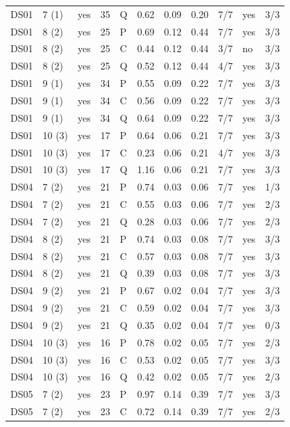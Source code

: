 \documentclass[10pt]{article}
\begin{document}
{\begin{longtable}{lllrlrrrrlr}
DS01 & 7 (1) & yes & 35 & Q & 0.62 & 0.09 & 0.20 & 7/7 & yes & 3/3 \\
DS01 & 8 (2) & yes & 25 & P & 0.69 & 0.12 & 0.44 & 7/7 & yes & 3/3 \\
DS01 & 8 (2) & yes & 25 & C & 0.44 & 0.12 & 0.44 & 3/7 & no & 3/3 \\
DS01 & 8 (2) & yes & 25 & Q & 0.52 & 0.12 & 0.44 & 4/7 & yes & 3/3 \\
DS01 & 9 (1) & yes & 34 & P & 0.55 & 0.09 & 0.22 & 7/7 & yes & 3/3 \\
DS01 & 9 (1) & yes & 34 & C & 0.56 & 0.09 & 0.22 & 7/7 & yes & 3/3 \\
DS01 & 9 (1) & yes & 34 & Q & 0.64 & 0.09 & 0.22 & 7/7 & yes & 3/3 \\
DS01 & 10 (3) & yes & 17 & P & 0.64 & 0.06 & 0.21 & 7/7 & yes & 3/3 \\
DS01 & 10 (3) & yes & 17 & C & 0.23 & 0.06 & 0.21 & 4/7 & yes & 3/3 \\
DS01 & 10 (3) & yes & 17 & Q & 1.16 & 0.06 & 0.21 & 7/7 & yes & 3/3 \\
\midrule
DS04 & 7 (2) & yes & 21 & P & 0.74 & 0.03 & 0.06 & 7/7 & yes & 1/3 \\
DS04 & 7 (2) & yes & 21 & C & 0.55 & 0.03 & 0.06 & 7/7 & yes & 2/3 \\
DS04 & 7 (2) & yes & 21 & Q & 0.28 & 0.03 & 0.06 & 7/7 & yes & 2/3 \\
DS04 & 8 (2) & yes & 21 & P & 0.74 & 0.03 & 0.08 & 7/7 & yes & 3/3 \\
DS04 & 8 (2) & yes & 21 & C & 0.57 & 0.03 & 0.08 & 7/7 & yes & 3/3 \\
DS04 & 8 (2) & yes & 21 & Q & 0.39 & 0.03 & 0.08 & 7/7 & yes & 3/3 \\
DS04 & 9 (2) & yes & 21 & P & 0.67 & 0.02 & 0.04 & 7/7 & yes & 3/3 \\
DS04 & 9 (2) & yes & 21 & C & 0.59 & 0.02 & 0.04 & 7/7 & yes & 3/3 \\
DS04 & 9 (2) & yes & 21 & Q & 0.35 & 0.02 & 0.04 & 7/7 & yes & 0/3 \\
DS04 & 10 (3) & yes & 16 & P & 0.78 & 0.02 & 0.05 & 7/7 & yes & 2/3 \\
DS04 & 10 (3) & yes & 16 & C & 0.53 & 0.02 & 0.05 & 7/7 & yes & 3/3 \\
DS04 & 10 (3) & yes & 16 & Q & 0.42 & 0.02 & 0.05 & 7/7 & yes & 2/3 \\
\midrule
DS05 & 7 (2) & yes & 23 & P & 0.97 & 0.14 & 0.39 & 7/7 & yes & 3/3 \\
DS05 & 7 (2) & yes & 23 & C & 0.72 & 0.14 & 0.39 & 7/7 & yes & 2/3 \\

\end{longtable}}
\end{document}
